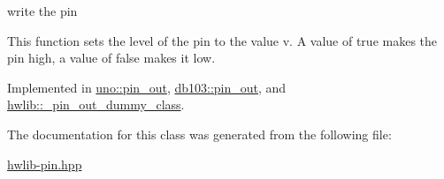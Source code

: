 write the pin 

This function sets the level of the pin to the value v. A value of true makes the pin high, a value of false makes it low. 

Implemented in \hyperlink{classuno_1_1pin__out_acdbf9464c592814d5b345dfb4aaa24c9}{uno\+::pin\+\_\+out}, \hyperlink{classdb103_1_1pin__out_a73b6d2c8c5c11baf263f5c3cd8078ad9}{db103\+::pin\+\_\+out}, and \hyperlink{classhwlib_1_1__pin__out__dummy__class_a2a1c7ef6046fbf45a92f5036632e4655}{hwlib\+::\+\_\+pin\+\_\+out\+\_\+dummy\+\_\+class}.



The documentation for this class was generated from the following file\+:\begin{DoxyCompactItemize}
\item 
\hyperlink{hwlib-pin_8hpp}{hwlib-\/pin.\+hpp}\end{DoxyCompactItemize}

